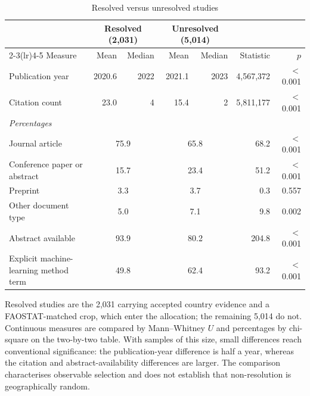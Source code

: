 \documentclass[ASNA,twocolumn]{USG}
\begin{document}
\begin{table}[t]
\centering
\footnotesize
\caption{Resolved versus unresolved studies}
\label{tab:resolution}
\begin{tabular*}{\textwidth}{@{\extracolsep\fill}l r r r r r r@{}}
\toprule
& \multicolumn{2}{c}{Resolved (2,031)} & \multicolumn{2}{c}{Unresolved (5,014)} & & \\
\cmidrule(lr){2-3}\cmidrule(lr){4-5}
Measure & Mean & Median & Mean & Median & Statistic & $p$ \\
\midrule
Publication year & 2020.6 & 2022 & 2021.1 & 2023 & 4,567,372 & $<$0.001 \\
Citation count & 23.0 & 4 & 15.4 & 2 & 5,811,177 & $<$0.001 \\
\midrule
\multicolumn{7}{l}{\textit{Percentages}} \\
Journal article & \multicolumn{2}{c}{75.9} & \multicolumn{2}{c}{65.8} & 68.2 & $<$0.001 \\
Conference paper or abstract & \multicolumn{2}{c}{15.7} & \multicolumn{2}{c}{23.4} & 51.2 & $<$0.001 \\
Preprint & \multicolumn{2}{c}{3.3} & \multicolumn{2}{c}{3.7} & 0.3 & 0.557 \\
Other document type & \multicolumn{2}{c}{5.0} & \multicolumn{2}{c}{7.1} & 9.8 & 0.002 \\
Abstract available & \multicolumn{2}{c}{93.9} & \multicolumn{2}{c}{80.2} & 204.8 & $<$0.001 \\
Explicit machine-learning method term & \multicolumn{2}{c}{49.8} & \multicolumn{2}{c}{62.4} & 93.2 & $<$0.001 \\
\bottomrule
\end{tabular*}
\begin{tablenotes}
\item[] Resolved studies are the 2,031 carrying accepted country evidence and a FAOSTAT-matched crop, which enter the allocation; the remaining 5,014 do not. Continuous measures are compared by Mann--Whitney $U$ and percentages by chi-square on the two-by-two table. With samples of this size, small differences reach conventional significance: the publication-year difference is half a year, whereas the citation and abstract-availability differences are larger. The comparison characterises observable selection and does not establish that non-resolution is geographically random.
\end{tablenotes}
\end{table}
\end{document}
